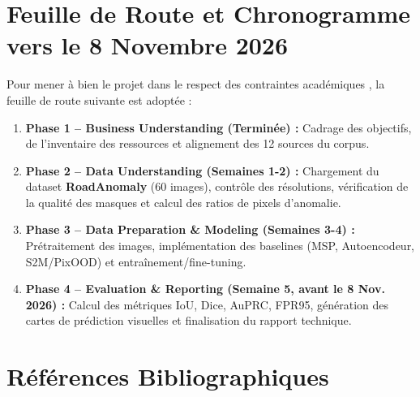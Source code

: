 \documentclass[11pt,a4paper]{article} \usepackage[utf8]{inputenc} \usepackage[T1]{fontenc}
\begin{document}
\section{Feuille de Route et Chronogramme vers le 8 Novembre 2026}
Pour mener à bien le projet dans le respect des contraintes académiques \cite{assignment2026}, la feuille
de route suivante est adoptée :
\begin{enumerate} \item \textbf{Phase 1 -- Business Understanding (Terminée) \cite{crispdm2026} :}
Cadrage des objectifs, de l'inventaire des ressources et alignement des 12 sources du corpus. \item
\textbf{Phase 2 -- Data Understanding (Semaines 1-2) \cite{lis2019detecting, assignment2026} :}
Chargement du dataset \textbf{RoadAnomaly} (60 images), contrôle des résolutions, vérification de la
qualité des masques et calcul des ratios de pixels d'anomalie. \item \textbf{Phase 3 -- Data Preparation
\& Modeling (Semaines 3-4) \cite{zhao2024survey, s2m2024, pixood2024, toyota2024} :} Prétraitement des
images, implémentation des baselines (MSP, Autoencodeur, S2M/PixOOD) et entraînement/fine-tuning. \item
\textbf{Phase 4 -- Evaluation \& Reporting (Semaine 5, avant le 8 Nov. 2026) \cite{assignment2026,
muller2024, chan2021segmentmeifyoucan} :} Calcul des métriques IoU, Dice, AuPRC, FPR95, génération des
cartes de prédiction visuelles et finalisation du rapport technique.
\end{enumerate}
\section{Références Bibliographiques}
\end{document}
